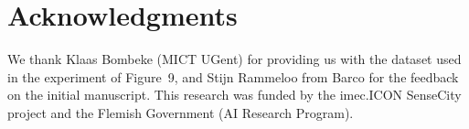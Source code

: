 \documentclass[letterpaper]{article} %
\begin{document}
\section{ Acknowledgments}
We thank Klaas Bombeke (MICT UGent) for providing us with the dataset used in the experiment of Figure~9, and Stijn Rammeloo from Barco for the feedback on the initial manuscript. This research was funded by the imec.ICON SenseCity project and the Flemish Government (AI Research Program).

\bigskip



\newpage
\end{document}
